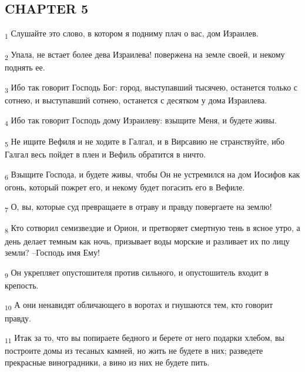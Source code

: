 \subsection{CHAPTER 5}
\begin{tcolorbox}
\textsubscript{1} Слушайте это слово, в котором я подниму плач о вас, дом Израилев.
\end{tcolorbox}
\begin{tcolorbox}
\textsubscript{2} Упала, не встает более дева Израилева! повержена на земле своей, и некому поднять ее.
\end{tcolorbox}
\begin{tcolorbox}
\textsubscript{3} Ибо так говорит Господь Бог: город, выступавший тысячею, останется только с сотнею, и выступавший сотнею, останется с десятком у дома Израилева.
\end{tcolorbox}
\begin{tcolorbox}
\textsubscript{4} Ибо так говорит Господь дому Израилеву: взыщите Меня, и будете живы.
\end{tcolorbox}
\begin{tcolorbox}
\textsubscript{5} Не ищите Вефиля и не ходите в Галгал, и в Вирсавию не странствуйте, ибо Галгал весь пойдет в плен и Вефиль обратится в ничто.
\end{tcolorbox}
\begin{tcolorbox}
\textsubscript{6} Взыщите Господа, и будете живы, чтобы Он не устремился на дом Иосифов как огонь, который пожрет его, и некому будет погасить его в Вефиле.
\end{tcolorbox}
\begin{tcolorbox}
\textsubscript{7} О, вы, которые суд превращаете в отраву и правду повергаете на землю!
\end{tcolorbox}
\begin{tcolorbox}
\textsubscript{8} Кто сотворил семизвездие и Орион, и претворяет смертную тень в ясное утро, а день делает темным как ночь, призывает воды морские и разливает их по лицу земли? --Господь имя Ему!
\end{tcolorbox}
\begin{tcolorbox}
\textsubscript{9} Он укрепляет опустошителя против сильного, и опустошитель входит в крепость.
\end{tcolorbox}
\begin{tcolorbox}
\textsubscript{10} А они ненавидят обличающего в воротах и гнушаются тем, кто говорит правду.
\end{tcolorbox}
\begin{tcolorbox}
\textsubscript{11} Итак за то, что вы попираете бедного и берете от него подарки хлебом, вы построите домы из тесаных камней, но жить не будете в них; разведете прекрасные виноградники, а вино из них не будете пить.
\end{tcolorbox}
